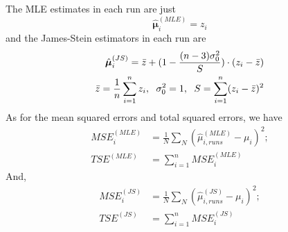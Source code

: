 \documentclass{article}
\begin{document}
The MLE estimates in each run are just
\begin{displaymath}
\hat{\bm{\mu}}^{(MLE)}_i = z_i
\end{displaymath}
and the James-Stein estimators in each run are
\begin{displaymath}
\begin{split}
\hat{\bm{\mu}}^{(JS)}_i = \bar{z} + (1-\frac{(n-3)\sigma_0^2}{S})\cdot (z_i - \bar{z}) \\
\bar{z} = \frac{1}{n} \sum_{i=1}^n z_i, \hspace{6 pt}
\sigma_0^2 = 1, \hspace{6 pt}
S = \sum_{i=1}^n (z_i - \bar{z})^2
\end{split}
\end{displaymath}
As for the mean squared errors and total squared errors, we have
\begin{displaymath}
\begin{split}
MSE_i^{(MLE)} &= \frac{1}{N} \sum_N (\hat{\mu}_{i,runs}^{(MLE)} - \mu_i)^2; \\
TSE^{(MLE)} &= \sum_{i=1}^n MSE_i^{(MLE)}
\end{split}
\end{displaymath}
And,
\begin{displaymath}
\begin{split}
MSE_i^{(JS)} &= \frac{1}{N} \sum_N (\hat{\mu}_{i,runs}^{(JS)} - \mu_i)^2; \\
TSE^{(JS)} &= \sum_{i=1}^n MSE_i^{(JS)}\\
\end{split}
\end{displaymath}

\end{document}
